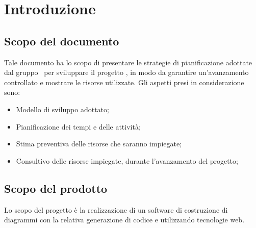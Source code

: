 \documentclass[../PianoDiProgetto.tex]{subfiles}
\begin{document}
	\section{Introduzione}
		\subsection{Scopo del documento}
			Tale documento ha lo scopo di presentare le strategie di pianificazione adottate
			dal gruppo \kaleidoscode\  per sviluppare il progetto 	\progetto, in modo
			da garantire un'avanzamento controllato e mostrare le risorse utilizzate.
			Gli aspetti presi in considerazione sono:
			\begin{itemize}
				\item Modello di sviluppo adottato;
				\item Pianificazione dei tempi e delle attività;
				\item Stima preventiva delle risorse che saranno impiegate;
				\item Consultivo delle risorse impiegate, durante l'avanzamento del progetto;
			\end{itemize}
		\subsection{Scopo del prodotto}
			Lo scopo del progetto è la realizzazione di un software di
			costruzione di diagrammi  con la relativa generazione
			di codice  e  utilizzando tecnologie
			web.
\end{document}
